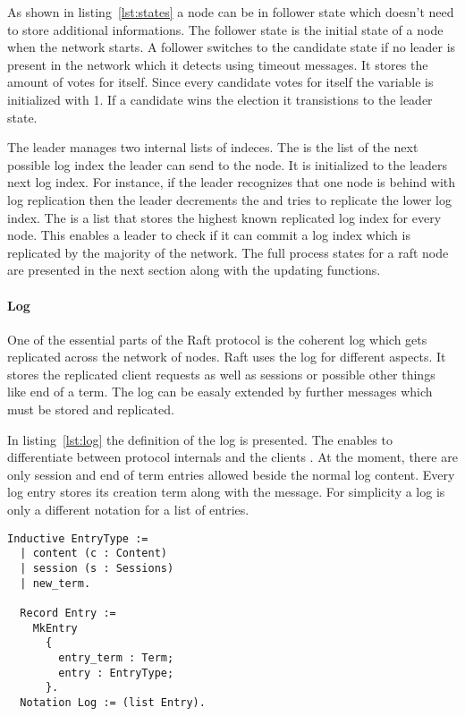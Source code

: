 As shown in listing~\ref{lst:states} a node can be in follower state which
doesn't need to store additional informations. The follower state is 
the initial state of a node when the network starts. A follower switches to the
candidate state if no leader is present in the network which it detects
using timeout messages. It stores the amount of votes for itself. 
Since every candidate votes for itself the  variable is initialized 
with 1. If a candidate wins the election it transistions to the leader state. 

The leader manages two internal lists of indeces. The  is the
list of the next possible log index the leader can send to the node. 
It is initialized to the leaders next log index. For instance, 
if the leader recognizes that one node is behind with log replication then
the leader decrements the  and tries to replicate the lower
log index. The  is a list that stores the highest known replicated
log index for every node. This enables a leader to check if it can commit a
log index which is replicated by the majority of the network.
The full process states for a raft node are presented in the next section along
with the updating functions.

\paragraph{Log}
One of the essential parts of the Raft protocol is the coherent log which gets
replicated across the network of nodes. Raft uses the log for different aspects.
It stores the replicated client requests as well as sessions or possible other
things like end of a term. The log can be easaly extended by further messages
which must be stored and replicated.

In listing~\ref{lst:log} the definition of the log is presented. The
 enables to differentiate between protocol internals
and the clients . At the moment, there are only session and
end of term entries allowed beside the normal log content. Every log entry
stores its creation term along with the message. For simplicity a log 
is only a different notation for a list of entries.

\begin{lstlisting}[style=coq,label=lst:log,caption=The definition of raft log.]
  Inductive EntryType :=
  | content (c : Content)
  | session (s : Sessions)
  | new_term.

  Record Entry :=
    MkEntry
      {
        entry_term : Term;
        entry : EntryType;
      }.
  Notation Log := (list Entry).
\end{lstlisting}

